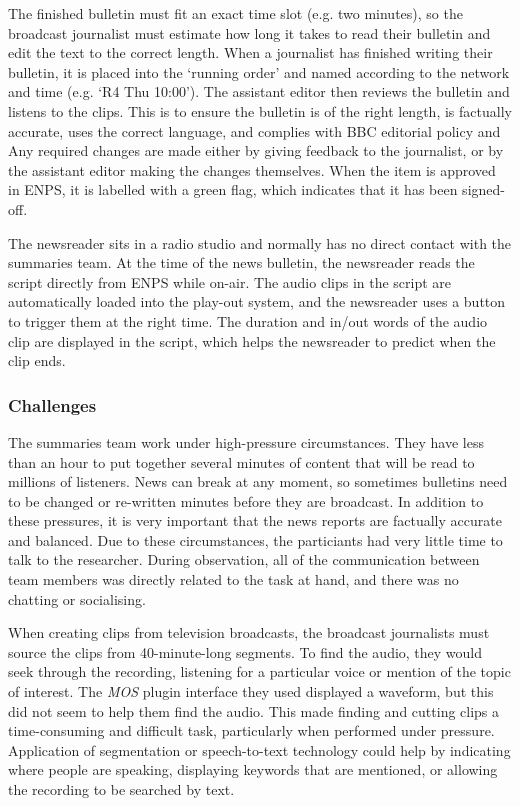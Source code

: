 The finished bulletin must fit an exact time slot (e.g. two minutes), so the broadcast journalist must estimate how
long it takes to read their bulletin and edit the text to the correct length.  When a journalist has finished writing
their bulletin, it is placed into the `running order' and named according to the network and time (e.g. `R4 Thu
10:00').  The assistant editor then reviews the bulletin and listens to the clips. This is to ensure the bulletin is of
the right length, is factually accurate, uses the correct language, and complies with BBC editorial policy and Any
required changes are made either by giving feedback to the journalist, or by the assistant editor making the changes
themselves.  When the item is approved in ENPS, it is labelled with a green flag, which indicates that it has been
signed-off.

The newsreader sits in a radio studio and normally has no direct contact with the summaries team.  At the time of the
news bulletin, the newsreader reads the script directly from ENPS while on-air. The audio clips in the script are
automatically loaded into the play-out system, and the newsreader uses a button to trigger them at the right time.  The
duration and in/out words of the audio clip are displayed in the script, which helps the newsreader to predict when the
clip ends.

\subsubsection{Challenges}

The summaries team work under high-pressure circumstances. They have less than an hour to put together several minutes
of content that will be read to millions of listeners. News can break at any moment, so sometimes bulletins need to be
changed or re-written minutes before they are broadcast. In addition to these pressures, it is very important that the
news reports are factually accurate and balanced.  Due to these circumstances, the particiants had very little time to
talk to the researcher. During observation, all of the communication between team members was directly related to the
task at hand, and there was no chatting or socialising.

When creating clips from television broadcasts, the broadcast journalists must source the clips from 40-minute-long
segments.  To find the audio, they would seek through the recording, listening for a particular voice or mention of the
topic of interest.  The \textit{MOS} plugin interface they used displayed a waveform, but this did not seem to help
them find the audio.  This made finding and cutting clips a time-consuming and difficult task, particularly when
performed under pressure.  Application of segmentation or speech-to-text technology could help by indicating where
people are speaking, displaying keywords that are mentioned, or allowing the recording to be searched by text.

